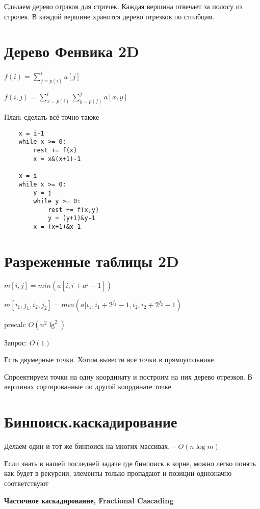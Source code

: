\documentclass{book}
\theoremstyle{definition}
\begin{document}
Сделаем дерево отрзков для строчек. Каждая вершина отвечает за полосу из строчек. В каждой вершине хранится дерево отрезков по столбцам.

\section{Дерево Фенвика 2D}

$f(i) = \sum_{j=p(i)}^{i} a[j]$ 

$f(i,j) = \sum_{x=p(i)}^{i} \sum_{y=p(j)}^{j} a[x,y]$ 

План: сделать всё точно также

\begin{verbatim}
    x = i-1
    while x >= 0:
        rest += f(x)
        x = x&(x+1)-1

    x = i
    while x >= 0:
        y = j
        while y >= 0:
            rest += f(x,y)
            y = (y+1)&y-1
        x = (x+1)&x-1
\end{verbatim}

\section{Разреженные таблицы 2D}

$m[i,j] = min\left( a[i,i+a^j-1] \right) $ 

$m[i_1, j_1, i_2, j_2] = min\left( a[i_1, i_1+2^{j_1}-1, i_2, i_2+2^{j_2}-1 \right) $

precalc $O(n^2\lg^2)$

Запрос: $O(1)$

 \begin{problem}
     Есть двумерные точки. Хотим вывести все точки в прямоугольнике.

     Спроектируем точки на одну координату и построим на них дерево отрезков. В вершинах сортированные по другой координате точке. 
 \end{problem}

 \section{Бинпоиск.каскадирование}

 Делаем один и тот же бинпоиск на многих массивах. -- $O\left( n\log m \right) $ 

 Если знать в нашей последней задаче где бинпоиск в корне, можно легко понять как будет в рекурсии, элементы только пропадают и позиции однозначно соответствуют

 \textbf{Частичное каскадирование, Fractional Cascading}
\end{document}

